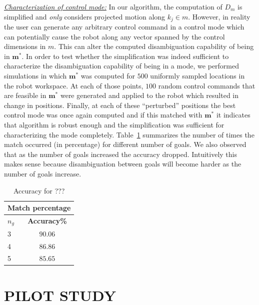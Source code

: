 \documentclass[conference]{IEEEtran}
\begin{document}
\noindent\underline{\textit{Characterization of control mode:}} In our algorithm, the computation of $D_{m}$ is simplified and \textit{only} considers projected motion along $k_j \in m$. However, in reality the user can generate any arbitrary control command in a control mode which can potentially cause the robot along any vector spanned by the control dimensions in $m$. This can alter the computed disambiguation capability of being in $\boldsymbol{m}^*$. In order to test whether the simplification was indeed sufficient to characterize the disambiguation capability of being in a mode, we performed simulations in which $\boldsymbol{m}^*$ was computed for $500$ uniformly sampled locations in the robot workspace. At each of those points, $100$ random control commands that are feasible in $\boldsymbol{m}^*$ were generated and applied to the robot which resulted in change in positions. Finally, at each of these ``perturbed'' positions the best control mode was once again computed and if this matched with $\boldsymbol{m}^*$ it indicates that algorithm is robust enough and the simplification was sufficient for characterizing the mode completely. Table~\ref{SIM} summarizes the number of times the match occurred (in percentage) for different number of goals. We also observed that as the number of goals increased the accuracy dropped. Intuitively this makes sense because disambiguation between goals will become harder as the number of goals increase.  
	\begin{table}
	\centering
	\begin{tabular}{|l|c|}
		\hline
		\multicolumn{2}{|c|}{Match percentage} \\
		\hline
		\textbf{$n_g$} & \textbf{Accuracy\%}\\
		\hline
		3 & $90.06$  \\ \hline
		4 & $86.86$   \\ \hline
		5 & $85.65$  \\ \hline
	\end{tabular}
	\vspace{.2cm}
	\caption{Accuracy for ???} 
	\label{SIM}
	\vspace{-.5cm}
\end{table}

\section{PILOT STUDY}\label{EXP}
\end{document}
